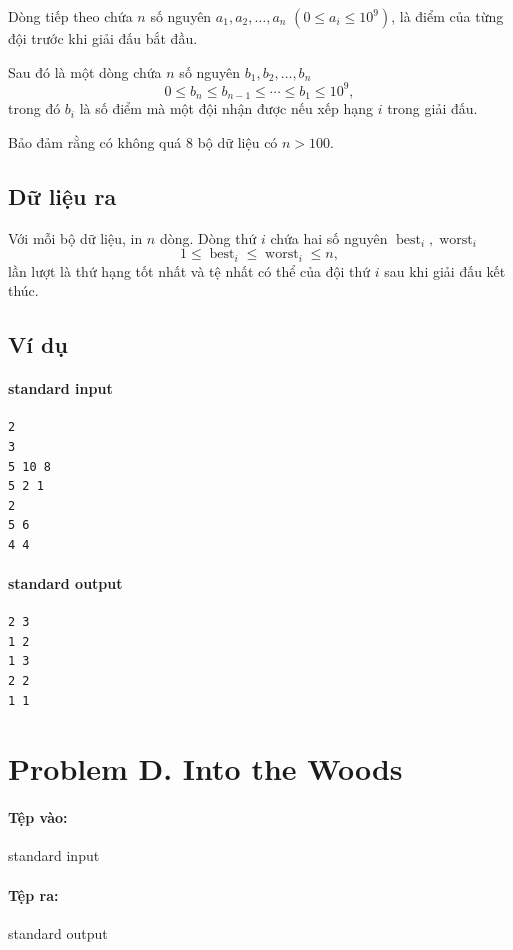 \documentclass[11pt]{article}
\begin{document}
Dòng tiếp theo chứa \(n\) số nguyên \(a_1,a_2,\ldots,a_n\)
\((0\le a_i\le 10^9)\), là điểm của từng đội trước khi giải đấu bắt đầu.

Sau đó là một dòng chứa \(n\) số nguyên \(b_1,b_2,\ldots,b_n\)
\[
  0\le b_n\le b_{n-1}\le\cdots\le b_1\le 10^9,
\]
trong đó \(b_i\) là số điểm mà một đội nhận được nếu xếp hạng \(i\) trong
giải đấu.

Bảo đảm rằng có không quá \(8\) bộ dữ liệu có \(n>100\).

\subsection*{Dữ liệu ra}

Với mỗi bộ dữ liệu, in \(n\) dòng. Dòng thứ \(i\) chứa hai số nguyên
\(\operatorname{best}_i,\operatorname{worst}_i\)
\[
  1\le \operatorname{best}_i\le \operatorname{worst}_i\le n,
\]
lần lượt là thứ hạng tốt nhất và tệ nhất có thể của đội thứ \(i\) sau khi
giải đấu kết thúc.

\subsection*{Ví dụ}

\paragraph{standard input}
\begin{verbatim}
2
3
5 10 8
5 2 1
2
5 6
4 4
\end{verbatim}

\paragraph{standard output}
\begin{verbatim}
2 3
1 2
1 3
2 2
1 1
\end{verbatim}

\section{Problem D. Into the Woods}

\paragraph{Tệp vào:} standard input
\paragraph{Tệp ra:} standard output
\end{document}
